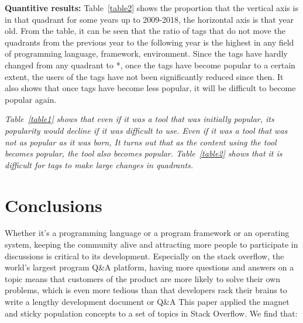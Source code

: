 \documentclass[conference]{IEEEtran}
\begin{document}
\textbf{Quantitive results:}
Table~\ref{table2} shows the proportion that the vertical axis is in that quadrant for some years up to 2009-2018, the horizontal axis is that year old. From the table, it can be seen that the ratio of tags that do not move the quadrants from the previous year to the following year is the highest in any field of programming language, framework, environment. Since the tags have hardly changed from any quadrant to *, once the tags have become popular to a certain extent, the users of the tags have not been significantly reduced since then. It also shows that once tags have become less popular, it will be difficult to become popular again.
\smallskip

\begin{oframed}
\emph{Table~\ref{table1} shows that even if it was a tool that was initially popular, its popularity would decline if it was difficult to use. Even if it was a tool that was not as popular as it was born, It turns out that as the content using the tool becomes popular, the tool also becomes popular. Table~\ref{table2} shows that it is difficult for tags to make large changes in quadrants.}

\end{oframed}


\section{Conclusions}

Whether it's a programming language or a program framework or an operating system, keeping the community alive and attracting more people to participate in discussions is critical to its development. Especially on the stack overflow, the world's largest program Q\&A platform, having more questions and answers on a topic means that customers of the product are more likely to solve their own problems, which is even more tedious than that developers rack their brains to write a lengthy development document or Q\&A This paper applied the magnet and sticky population concepts to a set of topics in Stack Overflow. We find that:
\end{document}
